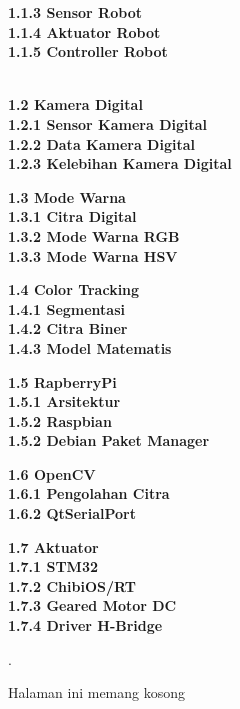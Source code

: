 \documentclass{article}
\begin{document}
\begin{enumerate}
\end{enumerate}

\noindent \textbf{1.1.3 Sensor Robot}
\\
\noindent \textbf{1.1.4 Aktuator Robot}
\\
\noindent \textbf{1.1.5 Controller Robot}
\\
\\
\vspace{2pt}

\noindent \textbf{1.2 Kamera Digital}
\\
\noindent \textbf{1.2.1 Sensor Kamera Digital}
\\
\noindent \textbf{1.2.2 Data Kamera Digital}
\\
\noindent \textbf{1.2.3 Kelebihan Kamera Digital}
\\
\vspace{2pt}

\noindent \textbf{1.3 Mode Warna}
\\
\noindent \textbf{1.3.1 Citra Digital}
\\
\noindent \textbf{1.3.2 Mode Warna RGB}
\\
\noindent \textbf{1.3.3 Mode Warna HSV}
\\
\vspace{2pt}

\noindent \textbf{1.4 Color Tracking}
\\
\noindent \textbf{1.4.1 Segmentasi}
\\
\noindent \textbf{1.4.2 Citra Biner}
\\
\noindent \textbf{1.4.3 Model Matematis}
\\
\vspace{2pt}

\noindent \textbf{1.5 RapberryPi}
\\
\noindent \textbf{1.5.1 Arsitektur}
\\
\noindent \textbf{1.5.2 Raspbian}
\\
\noindent \textbf{1.5.2 Debian Paket Manager}
\\
\vspace{2pt}

\noindent \textbf{1.6 OpenCV}
\\
\noindent \textbf{1.6.1 Pengolahan Citra}
\\
\noindent \textbf{1.6.2 QtSerialPort}
\\
\vspace{2pt}

\noindent \textbf{1.7 Aktuator}
\\
\noindent \textbf{1.7.1 STM32}
\\
\noindent \textbf{1.7.2 ChibiOS/RT}
\\
\noindent \textbf{1.7.3 Geared Motor DC}
\\
\noindent \textbf{1.7.4 Driver H-Bridge }
\\
\vspace{2pt}

\newpage
.\\
\vspace{200pt}

\hspace{75pt} Halaman ini memang kosong
\end{document}
